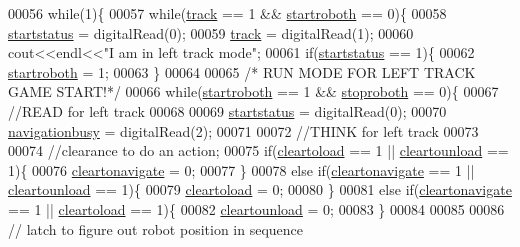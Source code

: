\begin{DoxyCode}
00056 \textcolor{keywordflow}{while}(1)\{
00057     \textcolor{keywordflow}{while}(\hyperlink{main_8cpp_addcde177bac7b0d7c1250ce907df0b70}{track} == 1 && \hyperlink{main_8cpp_ad9b6ac21900fa682d910b2c72a6d1a7f}{startroboth} == 0)\{
00058         \hyperlink{main_8cpp_a86ef28eff7b2064f6e9f34bb8371d523}{startstatus} = digitalRead(0);
00059         \hyperlink{main_8cpp_addcde177bac7b0d7c1250ce907df0b70}{track} = digitalRead(1);
00060         cout<<endl<<\textcolor{stringliteral}{"I am in left track mode"};
00061         \textcolor{keywordflow}{if}(\hyperlink{main_8cpp_a86ef28eff7b2064f6e9f34bb8371d523}{startstatus} == 1)\{
00062             \hyperlink{main_8cpp_ad9b6ac21900fa682d910b2c72a6d1a7f}{startroboth} = 1;
00063         \}
00064         
00065         \textcolor{comment}{/* RUN MODE FOR LEFT TRACK GAME START!*/}
00066         \textcolor{keywordflow}{while}(\hyperlink{main_8cpp_ad9b6ac21900fa682d910b2c72a6d1a7f}{startroboth} == 1 && \hyperlink{main_8cpp_ac941dfef463fc77cd96e79758d7d8a57}{stoproboth} == 0)\{
00067  \textcolor{comment}{//READ for left track}
00068             
00069             \hyperlink{main_8cpp_a86ef28eff7b2064f6e9f34bb8371d523}{startstatus} = digitalRead(0);
00070             \hyperlink{main_8cpp_ad384b7375208fa5ff0275908ffbfaeab}{navigationbusy} = digitalRead(2);
00071             
00072 \textcolor{comment}{//THINK for left track}
00073             
00074             \textcolor{comment}{//clearance to do an action;}
00075             \textcolor{keywordflow}{if}(\hyperlink{main_8cpp_a01a9037c5f3ab62063c4c2575609e631}{cleartoload} == 1 || \hyperlink{main_8cpp_a805838def3ffb9fb88e0cbeeeb359ce0}{cleartounload} == 1)\{
00076                 \hyperlink{main_8cpp_ac21c59d8afa80307c35596e0a9a579f7}{cleartonavigate} = 0;
00077             \}
00078             \textcolor{keywordflow}{else} \textcolor{keywordflow}{if}(\hyperlink{main_8cpp_ac21c59d8afa80307c35596e0a9a579f7}{cleartonavigate} == 1 || \hyperlink{main_8cpp_a805838def3ffb9fb88e0cbeeeb359ce0}{cleartounload} == 1)\{
00079                 \hyperlink{main_8cpp_a01a9037c5f3ab62063c4c2575609e631}{cleartoload} = 0;
00080             \}
00081             \textcolor{keywordflow}{else} \textcolor{keywordflow}{if}(\hyperlink{main_8cpp_ac21c59d8afa80307c35596e0a9a579f7}{cleartonavigate} == 1 || \hyperlink{main_8cpp_a01a9037c5f3ab62063c4c2575609e631}{cleartoload} == 1)\{
00082                 \hyperlink{main_8cpp_a805838def3ffb9fb88e0cbeeeb359ce0}{cleartounload} = 0;
00083             \}
00084 
00085             
00086             \textcolor{comment}{// latch to figure out robot position in sequence}

\end{DoxyCode}
